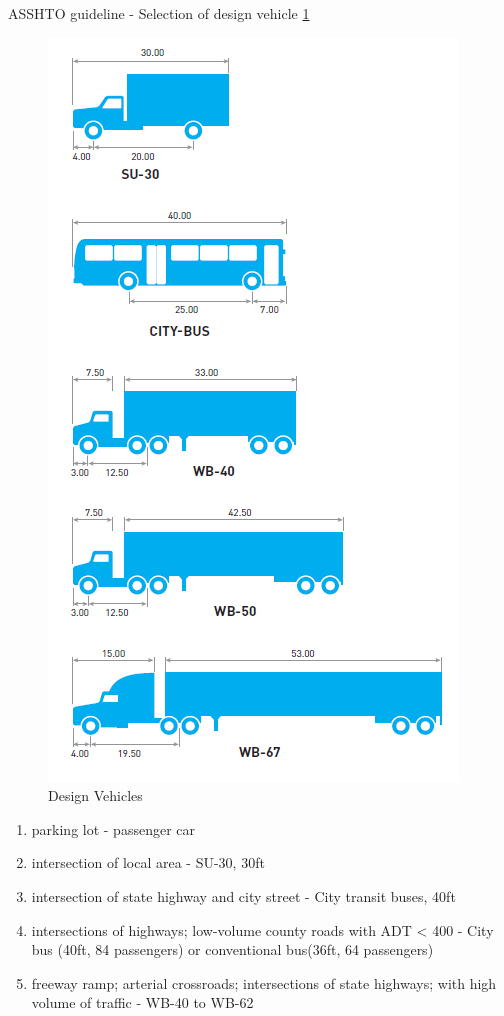 \documentclass{article}
\begin{document}
  ASSHTO guideline - Selection of design vehicle \ref{fig:image-design-vehicles}
  \begin{figure}[!ht]
    \includegraphics[width=0.7\linewidth]{design-vehicles.png}
    \caption{Design Vehicles}
    \label{fig:image-design-vehicles}
  \end{figure}
  \begin{enumerate}
    \item parking lot - passenger car
    \item intersection of local area - SU-30, 30ft
    \item intersection of state highway and city street - City transit buses, 40ft
    \item intersections of highways; low-volume county roads with ADT < 400 - City bus (40ft, 84 passengers) or conventional bus(36ft, 64 passengers)
    \item freeway ramp; arterial crossroads; intersections of state highways; with high volume of traffic - WB-40 to WB-62
  \end{enumerate}
\end{document}
